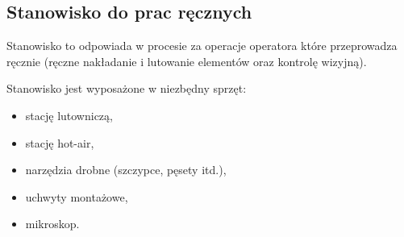 \subsection{Stanowisko do prac ręcznych}
Stanowisko to odpowiada w procesie za operacje operatora które przeprowadza ręcznie (ręczne nakładanie i lutowanie elementów oraz kontrolę wizyjną).

Stanowisko jest wyposażone w niezbędny sprzęt:
\begin{itemize}
	\item stację lutowniczą,
	\item stację hot-air,
	\item narzędzia drobne (szczypce, pęsety itd.),
	\item uchwyty montażowe,
	\item mikroskop.
\end{itemize}
